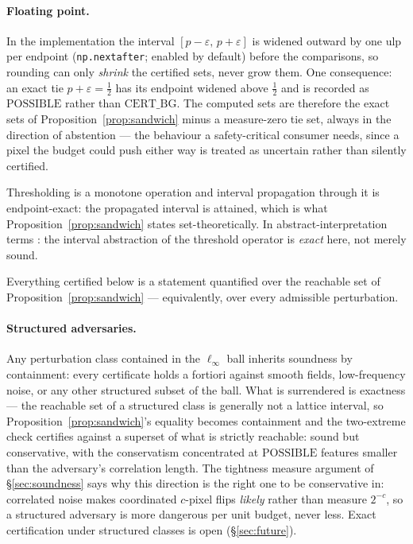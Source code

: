 \documentclass[10pt]{article}
\newcommand{\CBG}{\mathrm{CERT\_BG}}
\newcommand{\POSS}{\mathrm{POSSIBLE}}
\newcommand{\eps}{\varepsilon}
\begin{document}
\paragraph{Floating point.} In the implementation the interval
$[p-\eps,\,p+\eps]$ is widened outward by one ulp per endpoint
(\texttt{np.nextafter}; enabled by default) before the
comparisons, so rounding can only \emph{shrink} the certified sets, never
grow them. One consequence: an exact tie $p+\eps=\tfrac12$ has its
endpoint widened above $\tfrac12$ and is recorded as $\POSS$ rather than
$\CBG$. The computed sets are therefore the exact sets of
Proposition~\ref{prop:sandwich} minus a measure-zero tie set, always in
the direction of abstention --- the behaviour a safety-critical consumer
needs, since a pixel the budget could push either way is treated as
uncertain rather than silently certified.

Thresholding is a monotone operation and interval propagation through it
is endpoint-exact: the propagated interval is attained, which is what
Proposition~\ref{prop:sandwich} states set-theoretically. In abstract-interpretation terms
\citep{cousot1977}: the interval abstraction of the threshold operator is
\emph{exact} here, not merely sound.

Everything certified below is a statement quantified over the reachable
set of Proposition~\ref{prop:sandwich} --- equivalently, over every
admissible perturbation.

\paragraph{Structured adversaries.} Any perturbation class contained in
the $\ell_\infty$ ball inherits soundness by containment: every
certificate holds a fortiori against smooth fields, low-frequency noise,
or any other structured subset of the ball. What is surrendered is
exactness --- the reachable set of a structured class is generally not a
lattice interval, so Proposition~\ref{prop:sandwich}'s equality becomes
containment and the two-extreme check certifies against a superset of
what is strictly reachable: sound but conservative, with the conservatism
concentrated at $\POSS$ features smaller than the adversary's correlation
length. The tightness measure argument of \S\ref{sec:soundness} says why
this direction is the right one to be conservative in: correlated noise
makes coordinated $c$-pixel flips \emph{likely} rather than measure
$2^{-c}$, so a structured adversary is more dangerous per unit budget,
never less. Exact certification under structured classes is open
(\S\ref{sec:future}).
\end{document}

